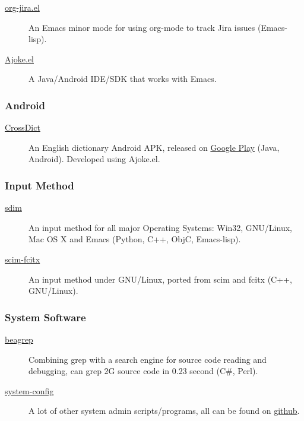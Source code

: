 \documentclass[11pt,dvipdfmx,CJKbookmarks]{article}
\begin{document}
\begin{CJK*}{UTF8}{simsun}
\begin{description}
\item[{\href{https://github.com/baohaojun/org-jira}{org-jira.el}}] An Emacs minor mode for using org-mode to track
Jira issues (Emacs-lisp).

\item[{\href{https://github.com/baohaojun/ajoke}{Ajoke.el}}] A Java/Android IDE/SDK that works with Emacs.
\end{description}

\subsubsection{Android}
\label{sec:org58d72d4}

\begin{description}
\item[{\href{https://github.com/baohaojun/BTAndroidWebViewSelection}{CrossDict}}] An English dictionary Android APK, released on \href{https://play.google.com/store/apps/details?id=com.baohaojun.crossdict}{Google
Play} (Java, Android). Developed using Ajoke.el.
\end{description}
\subsubsection{Input Method}
\label{sec:orgaf5870a}
\begin{description}
\item[{\href{https://github.com/baohaojun/system-config/tree/master/gcode/scim-cs/ime-py}{sdim}}] An input method for all major Operating Systems: Win32,
GNU/Linux, Mac OS X and Emacs (Python, C++, ObjC,
Emacs-lisp).

\item[{\href{https://github.com/scim-im/scim-fcitx}{scim-fcitx}}] An input method under GNU/Linux, ported from scim
and fcitx (C++, GNU/Linux).
\end{description}

\subsubsection{System Software}
\label{sec:org3912aad}

\begin{description}
\item[{\href{https://github.com/baohaojun/beagrep}{beagrep}}] Combining grep with a search engine for source code
reading and debugging, can grep 2G source code in 0.23
second (C\#, Perl).

\item[{\href{https://github.com/baohaojun/system-config}{system-config}}] A lot of other system admin scripts/programs, all
can be found on \href{https://github.com/baohaojun}{github}.
\end{description}



\end{CJK*}
\end{document}
